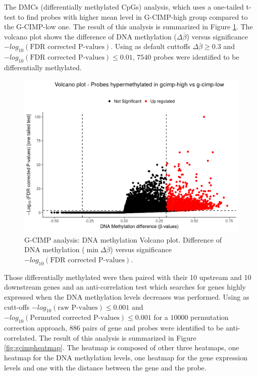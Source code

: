 The DMCs (differentially methylated CpGs) analysis, which uses a one-tailed t-test to find
probes with higher mean level in G-CIMP-high group compared to the G-CIMP-low one.
The result of this analysis is summarized in Figure \ref{fig:gcimpvolcano}.
The volcano plot shows the difference of DNA methylation ($\Delta\overline{\beta}$)
versus significance $-log_{10}(\textrm{FDR corrected P-values})$. Using as default cuttoffs
 $\Delta\overline{\beta}\geq0.3$ and $-log_{10}(\textrm{FDR corrected P-values})\leq 0.01$,
$7540$ probes were identified to be differentially methylated.

\begin{center}
\begin{figure}[h!]
\includegraphics[width=16cm]{images/gcimp_volcano.png}
\caption[G-CIMP analysis: Volcano plot]{\label{fig:gcimpvolcano}G-CIMP analysis: DNA methylation  Volcano plot. Difference of DNA methylation ($\min\Delta\overline{\beta}$) versus significance $-log_{10}(\textrm{FDR corrected P-values})$.}
\end{figure}

\end{center}

Those differentially methylated were then paired with their 10 upstream and 10 downstream genes
and an anti-correlation test which searches for genes highly expressed when the DNA methylation levels
decreases was performed.
Using as cutt-offs
$-log_{10}(\textrm{raw P-values})\leq 0.001$ and $-log_{10}(\textrm{Permuted corrected P-values})\leq 0.001$
for a  $10000$ permutation correction approach,
886 pairs of gene and probes were identified to be anti-correlated.
The result of this analysis is summarized in Figure \ref{fig:gcimpheatmap}.
The heatmap is composed of other three heatmaps, one heatmap for the DNA methylation levels,
one heatmap for the gene expression levels and one with the distance between
the gene and the probe.

